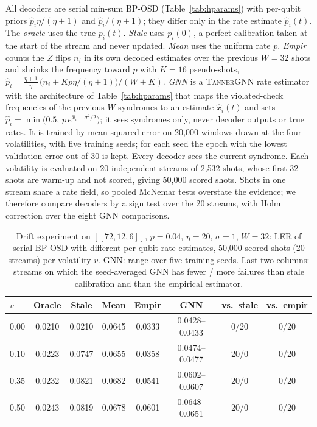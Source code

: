 \documentclass[a4paper,twocolumn,11pt,nopdfoutputerror]{quantumarticle}
\newcommand{\code}[3]{\ensuremath{[\![#1,#2,#3]\!]}}
\begin{document}
All decoders are serial min-sum BP-OSD (Table~\ref{tab:hparams}) with
per-qubit priors $\hat p_i\eta/(\eta+1)$ and $\hat p_i/(\eta+1)$; they
differ only in the rate estimate $\hat p_i(t)$. The \emph{oracle} uses the
true $p_i(t)$. \emph{Stale} uses $p_i(0)$, a perfect calibration taken at
the start of the stream and never updated. \emph{Mean} uses the uniform
rate $p$. \emph{Empir} counts the $Z$ flips $n_i$ in its own decoded
estimates over the previous $W=32$ shots and shrinks the frequency toward
$p$ with $K=16$ pseudo-shots,
$\hat p_i=\frac{\eta+1}{\eta}\,\bigl(n_i+Kp\eta/(\eta+1)\bigr)/(W+K)$.
\emph{GNN} is a \textsc{TannerGNN} rate estimator with the architecture of
Table~\ref{tab:hparams} that maps the violated-check frequencies of the
previous $W$ syndromes to an estimate $\hat x_i(t)$ and sets
$\hat p_i=\min\bigl(0.5,\,p\,e^{\hat x_i-\sigma^2/2}\bigr)$; it sees
syndromes only, never decoder outputs or true rates. It is trained by
mean-squared error on 20{,}000 windows drawn at the four volatilities,
with five training seeds; for each seed the epoch with the lowest
validation error out of 30 is kept. Every decoder sees the current
syndrome. Each volatility is evaluated on 20 independent streams of
2{,}532 shots, whose first 32 shots are warm-up and not scored, giving
50{,}000 scored shots. Shots in one stream share a rate field, so pooled
McNemar tests overstate the evidence; we therefore compare decoders by a
sign test over the 20 streams, with Holm correction over the eight GNN
comparisons.

\begin{table}[t]
\centering
\caption{Drift experiment on $\code{72}{12}{6}$, $p=0.04$, $\eta=20$,
         $\sigma=1$, $W=32$: LER of serial BP-OSD with different per-qubit
         rate estimates, 50{,}000 scored shots (20 streams) per
         volatility $v$. GNN: range over five training seeds. Last two
         columns: streams on which the seed-averaged GNN has fewer / more
         failures than stale calibration and than the empirical
         estimator.}
\label{tab:drift}
\begin{tabular}{@{}lccccccc@{}}
\toprule
$v$ & Oracle & Stale & Mean & Empir & GNN & vs.\ stale & vs.\ empir \\
\midrule
0.00 & 0.0210 & 0.0210 & 0.0645 & 0.0333 & 0.0428--0.0433 & 0/20 & 0/20 \\
0.10 & 0.0223 & 0.0747 & 0.0655 & 0.0358 & 0.0474--0.0477 & 20/0 & 0/20 \\
0.35 & 0.0232 & 0.0821 & 0.0682 & 0.0541 & 0.0602--0.0607 & 20/0 & 0/20 \\
0.50 & 0.0243 & 0.0819 & 0.0678 & 0.0601 & 0.0648--0.0651 & 20/0 & 0/20 \\
\bottomrule
\end{tabular}
\end{table}
\end{document}
